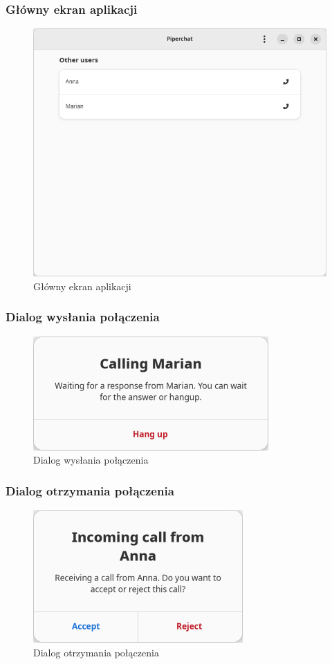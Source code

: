 \subsubsection{Główny ekran aplikacji}

\begin{figure}[H]
    \centering
    \includegraphics[width=.5\textwidth]{img/gui/screen_main}
    \caption{Główny ekran aplikacji}
\end{figure}

\subsubsection{Dialog wysłania połączenia}

\begin{figure}[H]
    \centering
    \includegraphics[width=.5\textwidth]{img/gui/screen_call_start}
    \caption{Dialog wysłania połączenia}
\end{figure}

\subsubsection{Dialog otrzymania połączenia}

\begin{figure}[H]
    \centering
    \includegraphics[width=.4\textwidth]{img/gui/screen_call_recv}
    \caption{Dialog otrzymania połączenia}
\end{figure}

